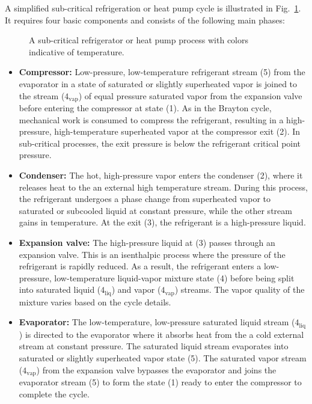 A simplified sub-critical refrigeration or heat pump cycle is illustrated in Fig.~\ref{fig:heat-pump}. It requires four basic components and consists of the following main phases:
\begin{figure}[!htb]
    \centering
    
    \caption{A sub-critical refrigerator or heat pump process with colors indicative of temperature.}
    \label{fig:heat-pump}
\end{figure}
\begin{itemize}
    \item[1--2] \textbf{Compressor:} Low-pressure, low-temperature refrigerant stream (5) from the evaporator in a state of saturated or slightly superheated vapor is joined to the stream ($4_\text{vap}$) of equal pressure saturated vapor from the expansion valve before entering the compressor at state (1). As in the Brayton cycle, mechanical work is consumed to compress the refrigerant, resulting in a high-pressure, high-temperature superheated vapor at the compressor exit (2). In sub-critical processes, the exit pressure is below the refrigerant critical point pressure.

    \item[2--3] \textbf{Condenser:} The hot, high-pressure vapor enters the condenser (2), where it releases heat to the an external high temperature stream. During this process, the refrigerant undergoes a phase change from superheated vapor to saturated or subcooled liquid at constant pressure, while the other stream gains in temperature. At the exit (3), the refrigerant is a high-pressure liquid.

    \item[3--4] \textbf{Expansion valve:} The high-pressure liquid at (3) passes through an expansion valve. This is an isenthalpic process where the pressure of the refrigerant is rapidly reduced. As a result, the refrigerant enters a low-pressure, low-temperature liquid-vapor mixture state (4) before being split into saturated liquid ($4_\text{liq}$) and vapor ($4_\text{vap}$) streams. The vapor quality of the mixture varies based on the cycle details.

    \item[4--1] \textbf{Evaporator:} The low-temperature, low-pressure saturated liquid stream ($4_\text{liq}$) is directed to the evaporator where it absorbs heat from the a cold external stream at constant pressure. The saturated liquid stream evaporates into saturated or slightly superheated vapor state (5). The saturated vapor stream ($4_\text{vap}$) from the expansion valve bypasses the evaporator and joins the evaporator stream (5) to form the state (1) ready to enter the compressor to complete the cycle.
\end{itemize}


